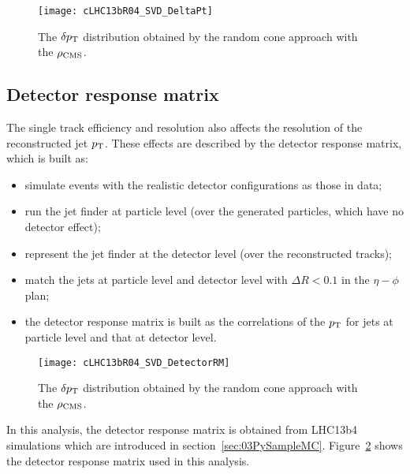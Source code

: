 \begin{figure}[htb]
\begin{center}
\texttt{[image: cLHC13bR04\_SVD\_DeltaPt]}
\caption{The $\delta p_{\rm T}$ distribution obtained by the random cone approach
         with the $\rho_{\rm CMS}$.}
\label{fig:c04DeltapT}
\end{center}
\end{figure}

\subsection{Detector response matrix}

The single track efficiency and resolution also affects the
resolution of the reconstructed jet $p_{\rm T}$.
These effects are described by the detector response matrix,
which is built as:
\begin{itemize}
\item simulate events with the realistic detector configurations as
      those in data;
\item run the jet finder at particle level (over the generated particles,
      which have no detector effect);
\item represent the jet finder at the detector level (over the reconstructed
      tracks);
\item match the jets at particle level and detector level with
      $\Delta R<0.1$ in the $\eta-\phi$ plan;
\item the detector response matrix is built as the correlations of the $p_{\rm T}$
      for jets at particle level and that at detector level.
\end{itemize}

\begin{figure}[htb]
\begin{center}
\texttt{[image: cLHC13bR04\_SVD\_DetectorRM]}
\caption{The $\delta p_{\rm T}$ distribution obtained by the random cone approach
         with the $\rho_{\rm CMS}$.}
\label{fig:c04DetectorRM}
\end{center}
\end{figure}

In this analysis, the detector response matrix is obtained from LHC13b4
simulations which are introduced in section~\ref{sec:03PySampleMC}.
Figure~\ref{fig:c04DetectorRM} shows the detector response matrix used in
this analysis.
